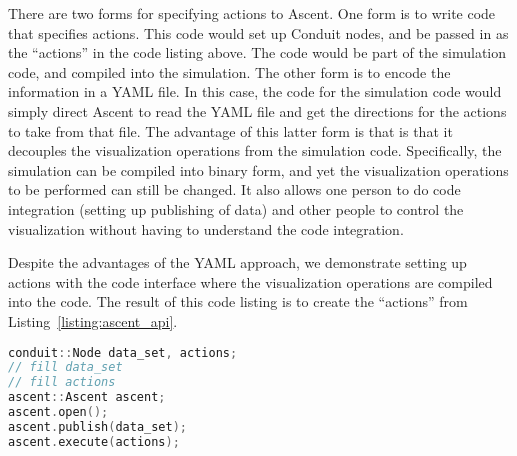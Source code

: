 There are two forms for specifying actions to Ascent.
%
One form is to write code that specifies actions.
%
This code would set up Conduit nodes, and be passed in as the ``actions'' in the
code listing above.
%
The code would be part of the simulation code, and compiled into the simulation.
%
The other form is to encode the information in a YAML file.
%
In this case, the code for the simulation code would simply direct Ascent to read
the YAML file and get the directions for the actions to take from that file.
%
The advantage of this latter form is that is that it decouples the visualization
operations from the simulation code.
%
Specifically, the simulation can be compiled into binary form, and yet the visualization
operations to be performed can still be changed.
%
It also allows one person to do code integration (setting up publishing of data)
and other people to control the visualization without having to understand
the code integration.

Despite the advantages of the YAML approach, we demonstrate setting up actions with
the code interface where the visualization operations are compiled into the code.
%
The result of this code listing is to create the ``actions'' from Listing~\ref{listing:ascent_api}.

\begin{lstlisting}[language=C++,caption={\label{listing:actions}Setting up Ascent actions using the C++ bindings.}]
conduit::Node data_set, actions;
// fill data_set 
// fill actions 
ascent::Ascent ascent;
ascent.open();
ascent.publish(data_set);
ascent.execute(actions);
\end{lstlisting}

